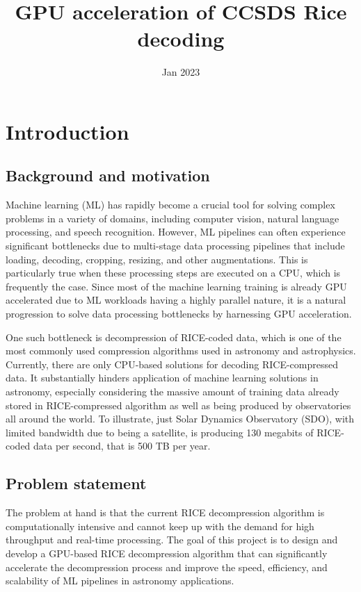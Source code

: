 \documentclass[licencjacka,en]{pracamgr}
\title{GPU acceleration of CCSDS Rice decoding}
\date{Jan 2023}
\begin{document}
\maketitle

\begin{abstract}
\end{abstract}

\tableofcontents

\chapter{Introduction}
\section{Background and motivation}
Machine learning (ML) has rapidly become a crucial tool for solving complex problems in a variety of domains, including computer vision, natural language processing, and speech recognition. However, ML pipelines can often experience significant bottlenecks due to multi-stage data processing pipelines that include loading, decoding, cropping, resizing, and other augmentations. This is particularly true when these processing steps are executed on a CPU, which is frequently the case. Since most of the machine learning training is already GPU accelerated due to ML workloads having a highly parallel nature, it is a natural progression to solve data processing bottlenecks by harnessing GPU acceleration. 

One such bottleneck is decompression of RICE-coded data, which is one of the most commonly used compression algorithms used in astronomy and astrophysics. Currently, there are only CPU-based solutions for decoding RICE-compressed data. It substantially hinders application of machine learning solutions in astronomy, especially considering the massive amount of training data already stored in RICE-compressed algorithm as well as being produced by observatories all around the world. To illustrate, just Solar Dynamics Observatory (SDO), with limited bandwidth due to being a satellite, is producing 130 megabits of RICE-coded data per second, that is 500 TB per year.

\section{Problem statement}
The problem at hand is that the current RICE decompression algorithm is computationally intensive and cannot keep up with the demand for high throughput and real-time processing. The goal of this project is to design and develop a GPU-based RICE decompression algorithm that can significantly accelerate the decompression process and improve the speed, efficiency, and scalability of ML pipelines in astronomy applications.
\end{document}

